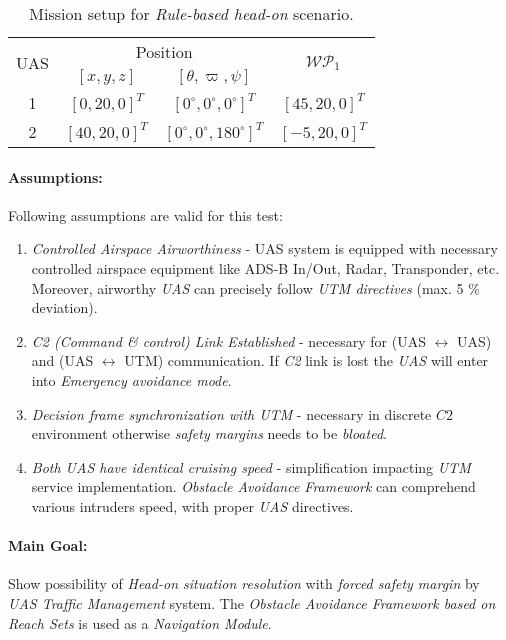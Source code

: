 \begin{table}[H]
    \centering
    \begin{tabular}{c||c|c||c}
        \multirow{2}{*}{UAS} &\multicolumn{2}{c||}{Position} & \multirow{2}{*}{$\mathscr{WP}_1$} \\\cline{2-3}
          & $[x,y,z]$           & $[\theta,\varpi,\psi]$           & \\\hline\hline
        1 & $[0,20,0]^T $       & $[0^\circ,0^\circ,0^\circ]^T$    & $[45,20,0]^T$\\\hline 
        2 & $[40,20,0]^T $       & $[0^\circ,0^\circ,180^\circ]^T$    & $[-5,20,0]^T$\\
    \end{tabular}
    \caption{Mission setup for \emph{Rule-based head-on} scenario.}
    \label{tab:missionSetupRuleBasedHeadOnScenario}
\end{table}

\paragraph{Assumptions:} Following assumptions are valid for this test:
    
\begin{enumerate}
    \item \emph{Controlled Airspace Airworthiness} - UAS system is equipped with necessary controlled airspace equipment like ADS-B In/Out, Radar, Transponder, etc. Moreover, airworthy \emph{UAS} can precisely follow \emph{UTM directives} (max. 5 $\%$ deviation).
    
    \item \emph{C2 (Command \& control) Link Established} - necessary for (UAS $\leftrightarrow$ UAS) and (UAS $\leftrightarrow$ UTM) communication. If \emph{C2} link is lost the \emph{UAS} will enter into \emph{Emergency avoidance mode}.
    
    \item \emph{Decision frame synchronization with UTM} - necessary in discrete $C2$ environment otherwise \emph{safety margins} needs to be \emph{bloated}.
    
    \item \emph{Both UAS have identical cruising speed} - simplification impacting \emph{UTM} service implementation. \emph{Obstacle Avoidance Framework} can comprehend various intruders speed, with proper \emph{UAS} directives.
\end{enumerate}

\paragraph{Main Goal:} Show possibility of \emph{Head-on situation resolution} with \emph{forced safety margin} by \emph{UAS Traffic Management} system.  The \emph{Obstacle Avoidance Framework based on Reach Sets} is used as a \emph{Navigation Module}.


